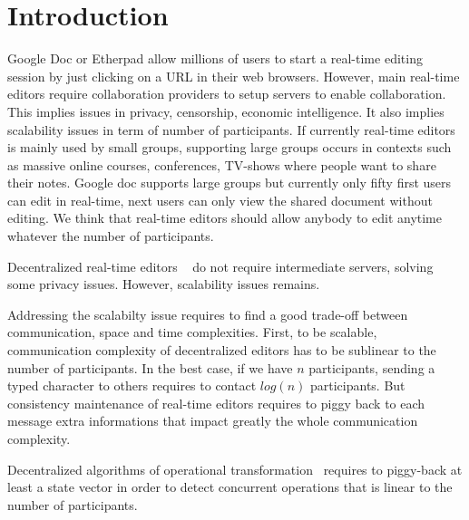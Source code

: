 
\section{Introduction}



Google Doc or Etherpad allow millions of users to start a real-time
editing session by just clicking on a URL in their web
browsers. However, main real-time editors require collaboration
providers to setup servers to enable collaboration. This implies
issues in privacy, censorship, economic intelligence. It also implies
scalability issues in term of number of participants. If currently
real-time editors is mainly used by small groups, supporting large
groups occurs in contexts such as massive online courses,
conferences, TV-shows where people want to share their notes. Google
doc supports large groups but currently only fifty first users can
edit in real-time, next users can only view the shared document
without editing. We think that real-time editors should allow anybody
to edit anytime whatever the number of participants.

Decentralized real-time editors ~\cite{oster2006data,
  sun1998operational, sun2009contextbased} do not require intermediate
servers, solving some privacy issues. However, scalability issues remains.
%

Addressing the scalabilty issue requires to find a good trade-off
between communication, space and time complexities. First, to be
scalable, communication complexity of decentralized editors has to be
sublinear to the number of participants. In the best case, if we have
$n$ participants, sending a typed character to others requires to
contact $log(n)$ participants. But consistency maintenance of
real-time editors requires to piggy back to each message extra
informations that impact greatly the whole communication complexity.

Decentralized algorithms of operational
transformation~\cite{sun2009contextbased} requires to piggy-back at
least a state vector in order to detect concurrent operations that is
linear to the number of participants.

